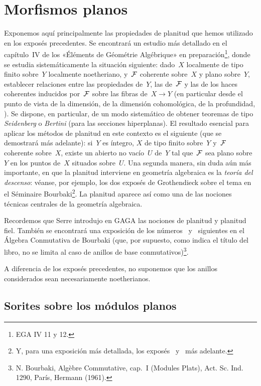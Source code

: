 
\chapter{Morfismos planos}\label{IV}

Exponemos aquí principalmente las propiedades de planitud que hemos utilizado en los exposés precedentes. Se encontrará un estudio más detallado en el capítulo~IV de los «Éléments de Géométrie Algébrique» en preparación\footnote{\Cf EGA IV 11 y 12.}, donde se estudia sistemáticamente la situación siguiente: dado~$X$ localmente de tipo finito sobre~$Y$ localmente noetheriano, y~$\cal{F}$ coherente sobre~$X$ y plano sobre~$Y$, establecer relaciones entre las propiedades de~$Y$, las de~$\cal{F}$ y las de los haces coherentes inducidos por~$\cal{F}$ sobre las fibras de~$X\to Y$ (en particular desde el punto de vista de la dimensión, de la dimensión cohomológica, de la profundidad, ).
Se dispone, en particular, de un modo sistemático de obtener teoremas de tipo \emph{Seidenberg} o \emph{Bertini} (para las secciones hiperplanas). El resultado esencial para aplicar los métodos de planitud en este contexto es el siguiente (que se demostrará más adelante): si~$Y$ es íntegro, $X$ de tipo finito sobre~$Y$ y~$\cal{F}$ coherente sobre~$X$, existe un abierto no vacío~$U$ de~$Y$ tal que~$\cal{F}$ sea plano sobre~$Y$ en los puntos de~$X$ situados sobre~$U$. Una segunda manera, sin duda aún más importante, en que la planitud interviene en geometría algebraica es la \emph{teoría del descenso}: véanse, por ejemplo, los dos exposés de Grothendieck sobre el tema en el Séminaire Bourbaki\footnote{Y, para una exposición más detallada, los exposés~ y~ más adelante.}. La planitud aparece así como una de las nociones técnicas centrales de la geometría algebraica.

Recordemos que Serre introdujo en GAGA las nociones de planitud y planitud fiel. También se encontrará una exposición de los números~ y~ siguientes en el Álgebra Conmutativa de Bourbaki (que, por supuesto, como indica el título del libro, no se limita al caso de anillos de base conmutativos)\footnote{N. Bourbaki, Algèbre Commutative, cap.~I (Modules Plats), Act. Sc. Ind. 1290, París, Hermann (1961).}.

A diferencia de los exposés precedentes, no suponemos que los anillos considerados sean necesariamente noetherianos.

\section{Sorites sobre los módulos planos}
\label{IV.1}

